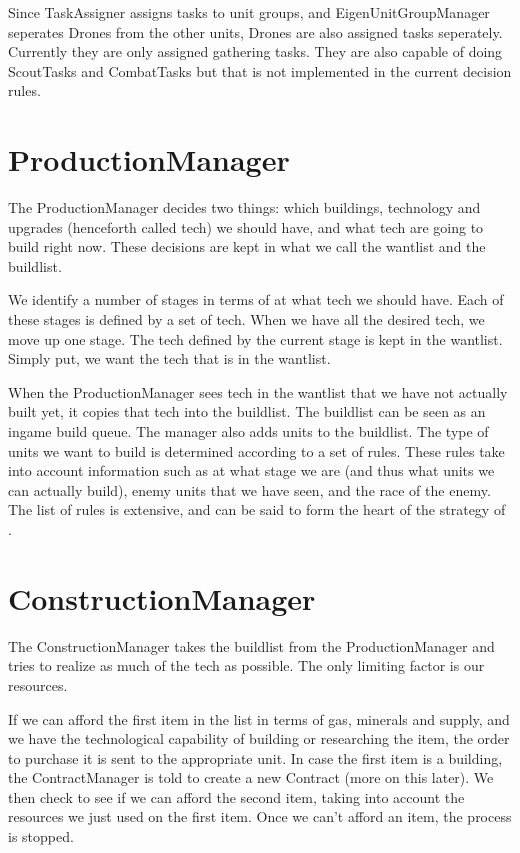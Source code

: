 Since TaskAssigner assigns tasks to unit groups, and EigenUnitGroupManager seperates Drones from the other units, Drones are also assigned tasks seperately. Currently they are only assigned gathering tasks. They are also capable of doing ScoutTasks and CombatTasks but that is not implemented in the current decision rules.

\section{ProductionManager}

The ProductionManager decides two things: which buildings, technology and upgrades (henceforth called tech) we should have, and what tech are going to build right now. These decisions are kept in what we call the wantlist and the buildlist.

We identify a number of stages in terms of at what tech we should have. Each of these stages is defined by a set of tech. When we have all the desired tech, we move up one stage. The tech defined by the current stage is kept in the wantlist. Simply put, we want the tech that is in the wantlist.

When the ProductionManager sees tech in the wantlist that we have not actually built yet, it copies that tech into the buildlist. The buildlist can be seen as an ingame build queue. The manager also adds units to the buildlist. The type of units we want to build is determined according to a set of rules. These rules take into account information such as at what stage we are (and thus what units we can actually build), enemy units that we have seen, and the race of the enemy. The list of rules is extensive, and can be said to form the heart of the strategy of \massexpand .

\section{ConstructionManager}

The ConstructionManager takes the buildlist from the ProductionManager and tries to realize as much of the tech as possible. The only limiting factor is our resources.

If we can afford the first item in the list in terms of gas, minerals and supply, and we have the technological capability of building or researching the item, the order to purchase it is sent to the appropriate unit. In case the first item is a building, the ContractManager is told to create a new Contract (more on this later). We then check to see if we can afford the second item, taking into account the resources we just used on the first item. Once we can't afford an item, the process is stopped.

